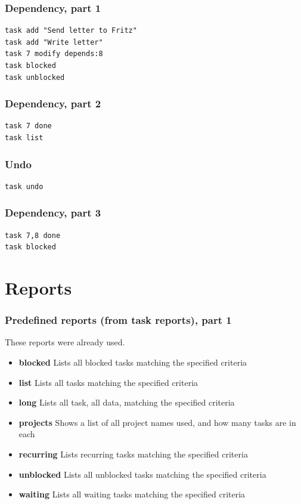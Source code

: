 \documentclass[t]{beamer}
\begin{document}
\begin{frame}[fragile]\frametitle{Dependency, part 1}
    \vfill
    \begin{lstlisting}
task add "Send letter to Fritz"
task add "Write letter"
task 7 modify depends:8
task blocked
task unblocked
\end{lstlisting}
\end{frame}

\begin{frame}[fragile]\frametitle{Dependency, part 2}
    \vfill
    \begin{lstlisting}
task 7 done
task list
\end{lstlisting}
\end{frame}

\begin{frame}[fragile]\frametitle{Undo}
    \vfill
    \begin{lstlisting}
task undo
\end{lstlisting}
\end{frame}

\begin{frame}[fragile]\frametitle{Dependency, part 3}
    \vfill
    \begin{lstlisting}
task 7,8 done
task blocked
\end{lstlisting}
\end{frame}

\section{Reports}

\begin{frame}[fragile]\frametitle{Predefined reports (from task reports), part 1}
    These reports were already used.

    \begin{itemize}
        \item \textbf{blocked}          Lists all blocked tasks matching the specified criteria
        \item \textbf{list}             Lists all tasks matching the specified criteria
        \item \textbf{long}             Lists all task, all data, matching the specified criteria
        \item \textbf{projects}         Shows a list of all project names used, and how many tasks are in each
        \item \textbf{recurring}        Lists recurring tasks matching the specified criteria
        \item \textbf{unblocked}        Lists all unblocked tasks matching the specified criteria
        \item \textbf{waiting}          Lists all waiting tasks matching the specified criteria
    \end{itemize}
\end{frame}
\end{document}
